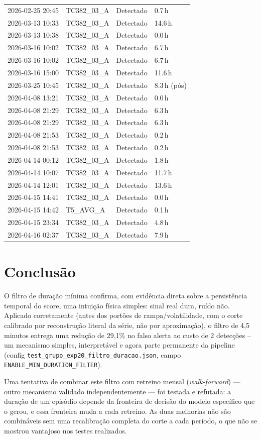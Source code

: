 \documentclass[11pt,a4paper]{article}
\begin{document}
\begin{longtable}{p{3.3cm}p{2.3cm}p{2.0cm}p{2.6cm}}
2026-02-25 20:45 & TC382\_03\_A & Detectado & 0.7\,h \\
2026-03-13 10:33 & TC382\_03\_A & Detectado & 14.6\,h \\
2026-03-13 10:38 & TC382\_03\_A & Detectado & 0.0\,h \\
2026-03-16 10:02 & TC382\_03\_A & Detectado & 6.7\,h \\
2026-03-16 10:02 & TC382\_03\_A & Detectado & 6.7\,h \\
2026-03-16 15:00 & TC382\_03\_A & Detectado & 11.6\,h \\
2026-03-25 10:45 & TC382\_03\_A & Detectado & 8.3\,h (pós) \\
2026-04-08 13:21 & TC382\_03\_A & Detectado & 0.0\,h \\
2026-04-08 21:29 & TC382\_03\_A & Detectado & 6.3\,h \\
2026-04-08 21:29 & TC382\_03\_A & Detectado & 6.3\,h \\
2026-04-08 21:53 & TC382\_03\_A & Detectado & 0.2\,h \\
2026-04-08 21:53 & TC382\_03\_A & Detectado & 0.2\,h \\
2026-04-14 00:12 & TC382\_03\_A & Detectado & 1.8\,h \\
2026-04-14 10:07 & TC382\_03\_A & Detectado & 11.7\,h \\
2026-04-14 12:01 & TC382\_03\_A & Detectado & 13.6\,h \\
2026-04-15 14:41 & TC382\_03\_A & Detectado & 0.0\,h \\
2026-04-15 14:42 & T5\_AVG\_A & Detectado & 0.1\,h \\
2026-04-15 23:34 & TC382\_03\_A & Detectado & 4.8\,h \\
2026-04-16 02:37 & TC382\_03\_A & Detectado & 7.9\,h \\
\end{longtable}

\section{Conclusão}
\label{sec:conclusao}

O filtro de duração mínima confirma, com evidência direta sobre a
persistência temporal do score, uma intuição física simples: sinal real
dura, ruído não. Aplicado corretamente (antes dos portões de
rampa/volatilidade, com o corte calibrado por reconstrução literal da
série, não por aproximação), o filtro de 4,5 minutos entrega uma
redução de 29,1\% no falso alerta ao custo de 2 detecções -- um
mecanismo simples, interpretável e agora parte permanente da pipeline
(config \texttt{test\_grupo\_exp20\_filtro\_duracao.json}, campo
\texttt{ENABLE\_MIN\_DURATION\_FILTER}).

Uma tentativa de combinar este filtro com retreino mensal
(\emph{walk-forward}) --- outro mecanismo validado independentemente
--- foi testada e refutada: a duração de um episódio depende da
fronteira de decisão do modelo específico que o gerou, e essa
fronteira muda a cada retreino. As duas melhorias não são
combináveis sem uma recalibração completa do corte a cada período, o
que não se mostrou vantajoso nos testes realizados.
\end{document}

